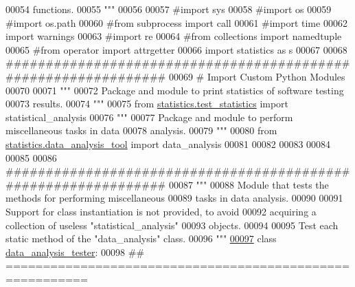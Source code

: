 \begin{DoxyCode}
00054 \textcolor{stringliteral}{                    functions.}
00055 \textcolor{stringliteral}{"""}
00056 
00057 \textcolor{comment}{#import sys}
00058 \textcolor{comment}{#import os}
00059 \textcolor{comment}{#import os.path}
00060 \textcolor{comment}{#from subprocess import call}
00061 \textcolor{comment}{#import time}
00062 \textcolor{keyword}{import} warnings
00063 \textcolor{comment}{#import re}
00064 \textcolor{comment}{#from collections import namedtuple}
00065 \textcolor{comment}{#from operator import attrgetter}
00066 \textcolor{keyword}{import} statistics \textcolor{keyword}{as} s
00067 
00068 \textcolor{comment}{###############################################################}
00069 \textcolor{comment}{#   Import Custom Python Modules}
00070 
00071 \textcolor{stringliteral}{"""}
00072 \textcolor{stringliteral}{    Package and module to print statistics of software testing}
00073 \textcolor{stringliteral}{        results.}
00074 \textcolor{stringliteral}{"""}
00075 \textcolor{keyword}{from} \hyperlink{namespacestatistics_1_1test__statistics}{statistics.test\_statistics} \textcolor{keyword}{import} statistical\_analysis
00076 \textcolor{stringliteral}{"""}
00077 \textcolor{stringliteral}{    Package and module to perform miscellaneous tasks in data}
00078 \textcolor{stringliteral}{        analysis.}
00079 \textcolor{stringliteral}{"""}
00080 \textcolor{keyword}{from} \hyperlink{namespacestatistics_1_1data__analysis__tool}{statistics.data\_analysis\_tool} \textcolor{keyword}{import} data\_analysis
00081 
00082 
00083 
00084 
00085 
00086 \textcolor{comment}{###############################################################}
00087 \textcolor{stringliteral}{"""}
00088 \textcolor{stringliteral}{    Module that tests the methods for performing miscellaneous}
00089 \textcolor{stringliteral}{        tasks in data analysis.}
00090 \textcolor{stringliteral}{}
00091 \textcolor{stringliteral}{    Support for class instantiation is not provided, to avoid}
00092 \textcolor{stringliteral}{        acquiring a collection of useless "statistical\_analysis"}
00093 \textcolor{stringliteral}{        objects.}
00094 \textcolor{stringliteral}{}
00095 \textcolor{stringliteral}{    Test each static method of the "data\_analysis" class.}
00096 \textcolor{stringliteral}{"""}
\hypertarget{test__data__analysis__tool_8py_source_l00097}{}\hyperlink{classstatistics_1_1test__data__analysis__tool_1_1data__analysis__tester}{00097} \textcolor{keyword}{class }\hyperlink{classstatistics_1_1test__data__analysis__tool_1_1data__analysis__tester}{data\_analysis\_tester}:
00098     \textcolor{comment}{## =========================================================}

\end{DoxyCode}
